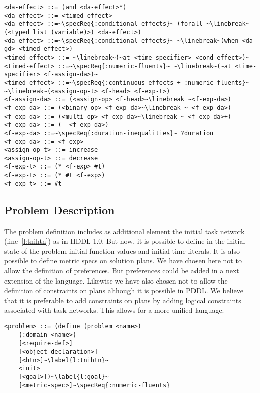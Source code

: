 \documentclass[letterpaper]{article} %
\begin{document}
\begin{lstlisting}[firstnumber=last, escapechar=~]
<da-effect> ::= (and <da-effect>*)
<da-effect> ::= <timed-effect>
<da-effect> ::=~\specReq{:conditional-effects}~ (forall ~\linebreak~(<typed list (variable)>) <da-effect>)
<da-effect> ::=~\specReq{:conditional-effects}~ ~\linebreak~(when <da-gd> <timed-effect>)
<timed-effect> ::= ~\linebreak~(~at <time-specifier> <cond-effect>)~
<timed-effect> ::=~\specReq{:numeric-fluents}~ ~\linebreak~(~at <time-specifier> <f-assign-da>)~
<timed-effect> ::=~\specReq{:continuous-effects + :numeric-fluents}~ ~\linebreak~(<assign-op-t> <f-head> <f-exp-t>)
<f-assign-da> ::= (<assign-op> <f-head>~\linebreak ~<f-exp-da>)
<f-exp-da> ::= (<binary-op> <f-exp-da>~\linebreak ~ <f-exp-da>)
<f-exp-da> ::= (<multi-op> <f-exp-da>~\linebreak ~ <f-exp-da>+)
<f-exp-da> ::= (- <f-exp-da>)
<f-exp-da> ::=~\specReq{:duration-inequalities}~ ?duration
<f-exp-da> ::= <f-exp>
<assign-op-t> ::= increase
<assign-op-t> ::= decrease
<f-exp-t> ::= (* <f-exp> #t)
<f-exp-t> ::= (* #t <f-exp>)
<f-exp-t> ::= #t
\end{lstlisting}

\subsection{Problem Description}

%
%
The problem definition includes as additional element the initial task network (line~\ref{l:tnihtn}) as in HDDL 1.0. But now, it is possible to define in the initial state of the problem initial function values and initial time literals. It is also possible to define metric specs on solution plans. We have chosen here not to allow the definition of preferences. But preferences could be added in a next extension of the language. Likewise we have also chosen not to allow the definition of constraints on plans although it is possible in PDDL. We believe that it is preferable to add constraints on plans by adding logical constraints associated with task networks. This allows for a more unified language.

\begin{lstlisting}[firstnumber=last, escapechar=~]
<problem> ::= (define (problem <name>)
    (:domain <name>)
    [<require-def>]
    [<object-declaration>]
    [<htn>]~\label{l:tnihtn}~
    <init>
    [<goal>])~\label{l:goal}~
    [<metric-spec>]~\specReq{:numeric-fluents}
\end{lstlisting}
\end{document}

